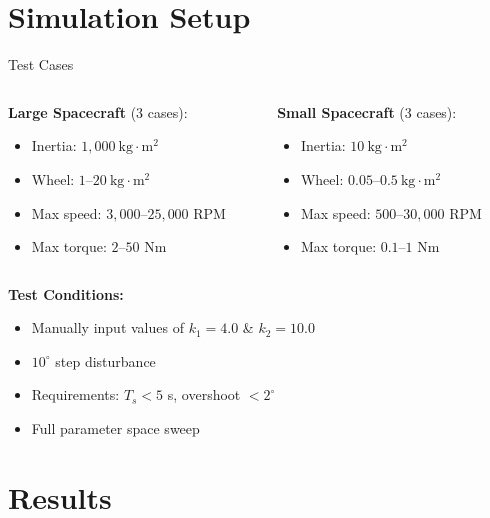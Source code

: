 \documentclass{beamer}
\begin{document}
\section{Simulation Setup}

\begin{frame}{Test Cases}
\begin{columns}
\begin{column}{0.5\textwidth}
\textbf{Large Spacecraft} (3 cases):
\begin{itemize}
  \item Inertia: $1{,}000~\text{kg}\cdot\text{m}^2$
  \item Wheel: $1$--$20~\text{kg}\cdot\text{m}^2$
  \item Max speed: $3{,}000$--$25{,}000$ RPM
  \item Max torque: $2$--$50$ Nm
\end{itemize}
\end{column}
\begin{column}{0.5\textwidth}
\textbf{Small Spacecraft} (3 cases):
\begin{itemize}
  \item Inertia: $10~\text{kg}\cdot\text{m}^2$
  \item Wheel: $0.05$--$0.5~\text{kg}\cdot\text{m}^2$
  \item Max speed: $500$--$30{,}000$ RPM
  \item Max torque: $0.1$--$1$ Nm
\end{itemize}
\end{column}
\end{columns}

\vspace{0.3cm}
\textbf{Test Conditions:}
\begin{itemize}
  \item Manually input values of $k_1 = 4.0$ \& $k_2 = 10.0$
  \item $10^\circ$ step disturbance
  \item Requirements: $T_s < 5$ s, overshoot $< 2^\circ$
  \item Full parameter space sweep
\end{itemize}
\end{frame}

\section{Results}
\end{document}

